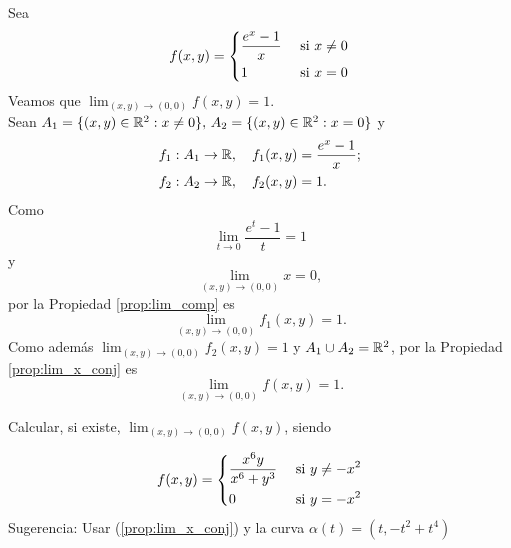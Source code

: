 \begin{example}   Sea 
  \[
   f(x,y) = 
     \begin{dcases}
        \dfrac{e^x - 1}{x}  & \text{ si } x \ne 0  \\
         1                 & \text{ si } x = 0
     \end{dcases}
  \]
 Veamos que $\lim_{(x,y) \to (0,0)} f(x,y) = 1$.\\
 Sean $A_1 = \{ (x,y) \in \mathbb{R}^2 : x \ne 0\}, \, A_2 = \{ (x,y) \in \mathbb{R}^2 : x = 0\}$ y 
 \begin{align*}
  f_1 &: A_1 \to \mathbb{R},\quad f_1(x,y) = \frac{e^x - 1}{x}; \\
  f_2 &: A_2 \to \mathbb{R},\quad f_2(x,y) = 1.
  \end{align*}
 Como 
 \[
    \lim_{t \to 0} \frac{e^t - 1}{t} = 1
 \]
 y 
 \[
    \lim_{(x,y) \to (0,0)} x = 0,
 \]
 por la Propiedad \ref{prop:lim_comp} es 
 \[
    \lim_{(x,y) \to (0,0)} f_1(x,y) = 1.
 \]
Como adem\'as $\lim_{(x,y) \to (0,0)} f_2(x,y) = 1$ y $A_1 \cup A_2 = \mathbb{R}^2$, por la Propiedad \ref{prop:lim_x_conj} es
 \[
  \lim_{(x,y) \to (0,0)} f(x,y) = 1.
 \]
\end{example}


\begin{tarea} Calcular, si existe,   $\lim_{(x,y) \to (0,0)} f(x,y)$, siendo  
  
 $$f(x,y) = 
     \begin{dcases}
        \dfrac{x^6 y}{x^6 + y^3}  & \text{ si }  y \ne -x^{2}  \\
         0               & \text{ si }   y  =  -x^{2}
     \end{dcases} $$
Sugerencia: Usar  (\ref{prop:lim_x_conj})  y la curva  $\alpha(t) = (t,-t^{2} + t^{4})$ 
\end{tarea}




